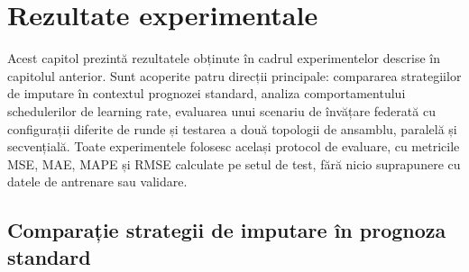 %
%
%

\chapter{Rezultate experimentale}

Acest capitol prezintă rezultatele obținute în cadrul experimentelor descrise în capitolul anterior. Sunt acoperite patru direcții principale: compararea strategiilor de imputare în contextul prognozei standard, analiza comportamentului schedulerilor de learning rate, evaluarea unui scenariu de învățare federată cu configurații diferite de runde și testarea a două topologii de ansamblu, paralelă și secvențială. Toate experimentele folosesc același protocol de evaluare, cu metricile MSE, MAE, MAPE și RMSE calculate pe setul de test, fără nicio suprapunere cu datele de antrenare sau validare.

\section{Comparație strategii de imputare în prognoza standard}

